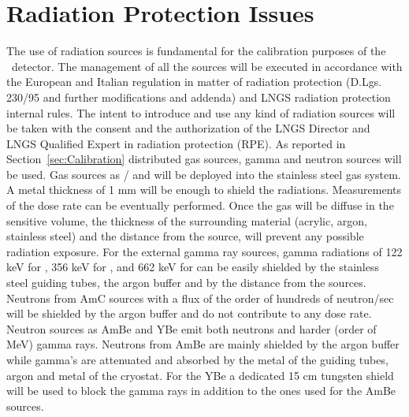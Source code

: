 \section{Radiation Protection Issues}
\label{sec:RadioProtection}




The use of radiation sources is fundamental for the calibration purposes of the \DSks\ detector.
The management of all the sources will be executed in accordance with the European and Italian regulation in matter of radiation protection (D.Lgs. 230/95 and further modifications and addenda) and LNGS radiation protection internal rules.
The intent to introduce and use any kind of radiation sources will be taken with the consent and the authorization of the LNGS Director and LNGS Qualified Expert in radiation protection (RPE).
As reported in Section~\ref{sec:Calibration} distributed gas sources, gamma and neutron sources will be used.
Gas sources as / and  will be deployed into the stainless steel gas system. A metal thickness of 1 mm will be enough to shield the radiations. Measurements of the dose rate can be eventually performed. Once the gas will be diffuse in the sensitive volume, the thickness of the surrounding material (acrylic, argon, stainless steel) and the distance from the source, will prevent any possible radiation exposure.
For the external gamma ray sources, gamma radiations of 122 keV for , 356 keV for , and 662 keV for  can be easily shielded by the stainless steel guiding tubes, the argon buffer and by the distance from the sources.
Neutrons from AmC sources with a flux of the order of hundreds of neutron/sec will be shielded by the argon buffer and do not contribute to any dose rate.
Neutron sources as AmBe and YBe emit both neutrons and harder (order of MeV) gamma rays. Neutrons from AmBe are mainly shielded by the argon buffer while gamma's are attenuated and absorbed by the metal of the guiding tubes, argon and metal of the cryostat. For the YBe a dedicated 15 cm tungsten shield will be used to block the gamma rays in addition to the ones used for the AmBe sources.


